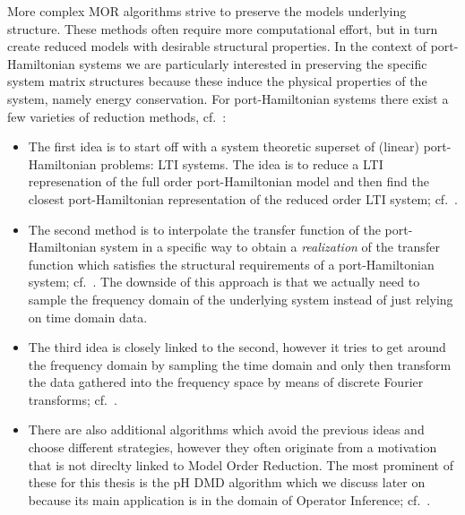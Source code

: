 More complex MOR algorithms strive to preserve the models underlying structure.
These methods often require more computational effort, but in turn create reduced models with desirable structural properties.
In the context of port-Hamiltonian systems we are particularly interested in preserving the specific system matrix structures because these induce the physical properties of the system, namely energy conservation.
For port-Hamiltonian systems there exist a few varieties of reduction methods, cf.~\cite{Polyuga2010}:
\begin{itemize}
    \item The first idea is to start off with a system theoretic superset of (linear) port-Hamiltonian problems: \ac{LTI} systems.
        The idea is to reduce a \ac{LTI} represenation of the full order port-Hamiltonian model and then find the closest port-Hamiltonian representation of the reduced order \ac{LTI} system; cf.~\cite{Gillis2018, Cherifi2019}.
    \item The second method is to interpolate the transfer function of the port-Hamiltonian system in a specific way to obtain a \emph{realization} of the transfer function which satisfies the structural requirements of a port-Hamiltonian system; cf.~\cite{BGD2020, Schwerdtner2021, Poussot2022}.
        The downside of this approach is that we actually need to sample the frequency domain of the underlying system instead of just relying on time domain data.
    \item The third idea is closely linked to the second, however it tries to get around the frequency domain by sampling the time domain and only then transform the data gathered into the frequency space by means of discrete Fourier transforms; cf.~\cite{Najnudel2021, Cherifi2022, Günther2023}.
    \item There are also additional algorithms which avoid the previous ideas and choose different strategies, however they often originate from a motivation that is not direclty linked to Model Order Reduction.
        The most prominent of these for this thesis is the pH DMD algorithm which we discuss later on because its main application is in the domain of Operator Inference; cf.~\cite{Morandin2022}.
\end{itemize}

